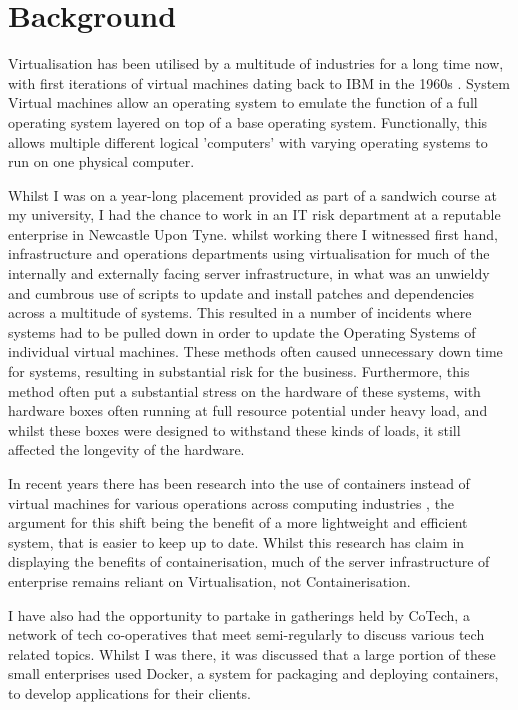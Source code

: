 
\section{Background}
Virtualisation has been utilised by a multitude of industries for a long time now, with first iterations of virtual machines dating back to IBM in the 1960s \citep{pugh95}. System Virtual machines allow an operating system to emulate the function of a full operating system layered on top of a base operating system. Functionally, this allows multiple different logical 'computers' with varying operating systems to run on one physical computer.

Whilst I was on a year-long placement provided as part of a sandwich course at my university, I had the chance to work in an IT risk department at a reputable enterprise in Newcastle Upon Tyne. whilst working there I witnessed first hand, infrastructure and operations departments using virtualisation for much of the internally and externally facing server infrastructure, in what was an unwieldy and cumbrous use of scripts to update and install patches and dependencies across a multitude of systems. This resulted in a number of incidents where systems had to be pulled down in order to update the Operating Systems of individual virtual machines. These methods often caused unnecessary down time for systems, resulting in substantial risk for the business. Furthermore, this method often put a substantial stress on the hardware of these systems, with hardware boxes often running at full resource potential under heavy load, and whilst these boxes were designed to withstand these kinds of loads, it still affected the longevity of the hardware.

In recent years there has been research into the use of containers instead of virtual machines for various operations across computing industries \citep{watanda19}, the argument for this shift being the benefit of a more lightweight and efficient system, that is easier to keep up to date. Whilst this research has claim in displaying the benefits of containerisation, much of the server infrastructure of enterprise remains reliant on Virtualisation, not Containerisation.

I have also had the opportunity to partake in gatherings held by CoTech, a network of tech co-operatives that meet semi-regularly to discuss various tech related topics. Whilst I was there, it was discussed that a large portion of these small enterprises used Docker, a system for packaging and deploying containers, to develop applications for their clients.

